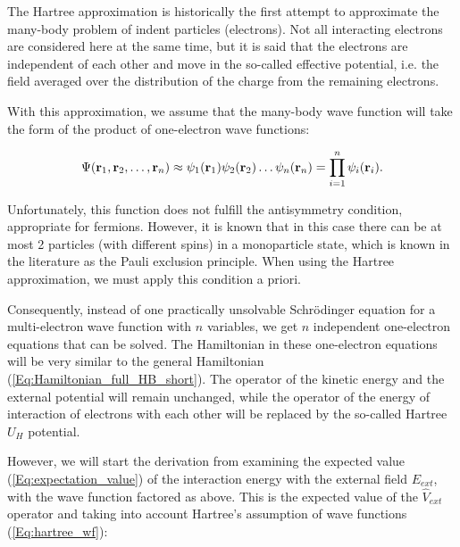 The Hartree approximation is historically the first attempt to approximate the many-body problem of indent particles (electrons).
Not all interacting electrons are considered here at the same time, but it is said that the electrons are independent of each other and move in the so-called effective potential, i.e. the field averaged over the distribution of the charge from the remaining electrons.

With this approximation, we assume that the many-body wave function will take the form of the product of one-electron wave functions:

\begin{equation}
    \label{Eq:hartree_wf}
    \Psi(\mathbf{r}_1, \mathbf{r}_2, \dots,\mathbf{r}_n)\approx\psi_1(\mathbf{r}_1)\psi_2(\mathbf{r}_2)\dots\psi_n(\mathbf{r}_n)=\prod_{i=1}^n\psi_i(\mathbf{r}_i).
\end{equation}

Unfortunately, this function does not fulfill the antisymmetry condition, appropriate for fermions.
However, it is known that in this case there can be at most 2 particles (with different spins) in a monoparticle state, which is known in the literature as the Pauli exclusion principle.
When using the Hartree approximation, we must apply this condition a priori.

Consequently, instead of one practically unsolvable Schr\"odinger equation for a multi-electron wave function with $n$ variables, we get $n$ independent one-electron equations that can be solved.
The Hamiltonian in these one-electron equations will be very similar to the general Hamiltonian (\ref{Eq:Hamiltonian_full_HB_short}).
The operator of the kinetic energy and the external potential will remain unchanged, while the operator of the energy of interaction of electrons with each other will be replaced by the so-called Hartree $U_H$ potential.

However, we will start the derivation from examining the expected value (\ref{Eq:expectation_value}) of the interaction energy with the external field $E_{ext}$, with the wave function factored as above.
This is the expected value of the $\hat{V}_{ext}$ operator and taking into account Hartree's assumption of wave functions (\ref{Eq:hartree_wf}):

